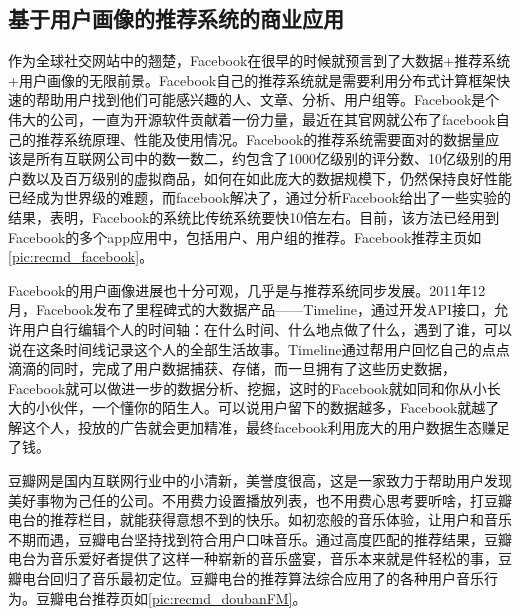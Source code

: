 		\subsection{基于用户画像的推荐系统的商业应用}
		\begin{figure}
	    \centering
	      \label{pic:recmd_facebook}
	    \end{figure}
		作为全球社交网站中的翘楚，Facebook在很早的时候就预言到了大数据+推荐系统+用户画像的无限前景。Facebook自己的推荐系统就是需要利用分布式计算框架快速的帮助用户找到他们可能感兴趣的人、文章、分析、用户组等。Facebook是个伟大的公司，一直为开源软件贡献着一份力量，最近在其官网就公布了facebook自己的推荐系统原理、性能及使用情况\citep{recmd-facebook}。Facebook的推荐系统需要面对的数据量应该是所有互联网公司中的数一数二，约包含了1000亿级别的评分数、10亿级别的用户数以及百万级别的虚拟商品，如何在如此庞大的数据规模下，仍然保持良好性能已经成为世界级的难题，而facebook解决了，通过分析Facebook给出了一些实验的结果，表明，Facebook的系统比传统系统要快10倍左右。目前，该方法已经用到Facebook的多个app应用中，包括用户、用户组的推荐。Facebook推荐主页如\autoref{pic:recmd_facebook}。
		
		Facebook的用户画像进展也十分可观，几乎是与推荐系统同步发展。2011年12月，Facebook发布了里程碑式的大数据产品——Timeline，通过开发API接口，允许用户自行编辑个人的时间轴：在什么时间、什么地点做了什么，遇到了谁，可以说在这条时间线记录这个人的全部生活故事。Timeline通过帮用户回忆自己的点点滴滴的同时，完成了用户数据捕获、存储，而一旦拥有了这些历史数据，Facebook就可以做进一步的数据分析、挖掘，这时的Facebook就如同和你从小长大的小伙伴，一个懂你的陌生人。可以说用户留下的数据越多，Facebook就越了解这个人，投放的广告就会更加精准，最终facebook利用庞大的用户数据生态赚足了钱。

		豆瓣网是国内互联网行业中的小清新，美誉度很高，这是一家致力于帮助用户发现美好事物为己任的公司\citep{recmd-douban}。不用费力设置播放列表，也不用费心思考要听啥，打豆瓣电台的推荐栏目，就能获得意想不到的快乐。如初恋般的音乐体验，让用户和音乐不期而遇，豆瓣电台坚持找到符合用户口味音乐。通过高度匹配的推荐结果，豆瓣电台为音乐爱好者提供了这样一种崭新的音乐盛宴，音乐本来就是件轻松的事，豆瓣电台回归了音乐最初定位。豆瓣电台的推荐算法\citep{recmd-kmeans}综合应用了的各种用户音乐行为\citep{recmd-doubanFM}。豆瓣电台推荐页如\autoref{pic:recmd_doubanFM}。

